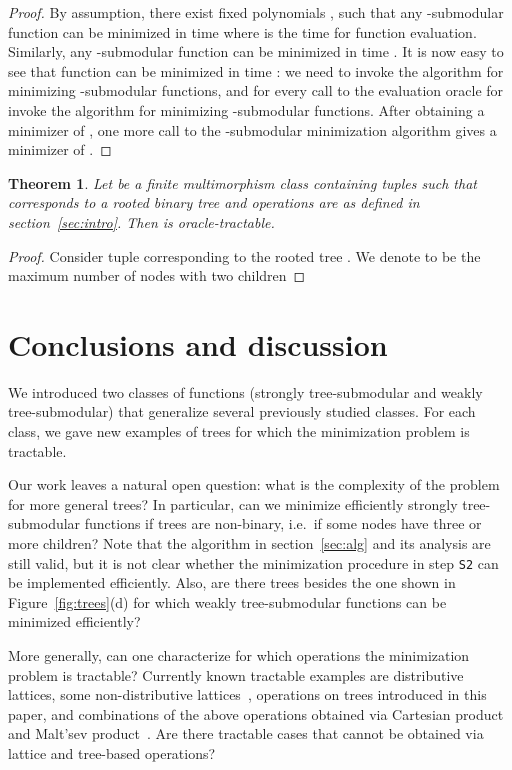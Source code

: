 \documentclass[11pt,onecolumn]{article}
\newtheorem{theorem}{Theorem}
\begin{document}
{\begin{proof}
By assumption, there exist fixed polynomials ,  such
that any -submodular function can be minimized in time 
where  is the time for function evaluation. Similarly, any -submodular function can be minimized in time .
It is now easy to see that function  can be minimized in time :
we need to invoke the algorithm for minimizing -submodular functions, and for every call to the evaluation oracle
for  invoke the algorithm for minimizing -submodular functions. After obtaining a minimizer of ,
one more call to the -submodular minimization algorithm gives a minimizer of .
\end{proof}

\begin{theorem}
Let  be a finite multimorphism class containing tuples  such
that  corresponds to a rooted binary tree and operations  are as defined in section~\ref{sec:intro}.
Then  is oracle-tractable.
\end{theorem}
\begin{proof}
Consider tuple  corresponding to the rooted tree .
We denote  to be the maximum number of nodes with two children
\end{proof}
}

\section{Conclusions and discussion}
We introduced two classes of functions (strongly tree-submodular and weakly tree-submodular)
that generalize several previously studied classes. For each class, we gave new examples of trees
for which the minimization problem is tractable.

Our work leaves a natural open question: what is the complexity of the problem for more general trees?
In particular, can we minimize efficiently strongly tree-submodular functions if trees are non-binary,
i.e.\ if some nodes have three or more children? Note that the algorithm in section~\ref{sec:alg}
and its analysis are still valid, but it is not clear whether the minimization procedure in step {\tt S2}
can be implemented efficiently. Also, are there trees besides the one shown in Figure~\ref{fig:trees}(d)
for which weakly tree-submodular functions can be minimized efficiently?

More generally, can one characterize for which operations  the minimization problem
is tractable? Currently known tractable examples are distributive lattices, some non-distributive lattices~\cite{KrokhinLarose:08,Kuivinen:TR},
operations on trees introduced in this paper, and combinations of the above operations obtained via Cartesian product and Malt'sev product~\cite{KrokhinLarose:08}.
Are there tractable cases that cannot be obtained via lattice and tree-based operations?
\end{document}
